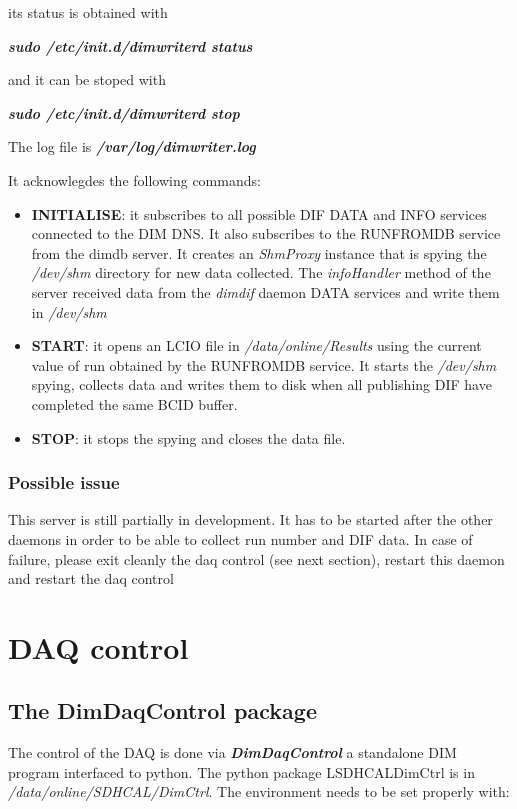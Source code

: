 \documentclass[english]{article}
\begin{document}
its status is obtained with 

{\sl \bf sudo /etc/init.d/dimwriterd status }

and it can be stoped with

{\sl \bf sudo /etc/init.d/dimwriterd stop }
 
 The log file is {\sl \bf /var/log/dimwriter.log }
 
 It acknowlegdes the following commands:
 \begin{itemize}
\item {\bf INITIALISE}: it subscribes to all possible DIF DATA and INFO services connected to the DIM DNS. It also subscribes to the RUNFROMDB service from the dimdb server. It creates an {\sl ShmProxy} instance that is spying the {\sl /dev/shm} directory for new data collected. The {\sl infoHandler} method of the server received data from the {\sl dimdif} daemon DATA services and write them in {\sl /dev/shm}
\item {\bf START}: it opens an LCIO file in {\sl /data/online/Results} using the current value of run obtained by the RUNFROMDB service. It starts the {\sl /dev/shm} spying, collects data and writes them to disk when all publishing DIF have completed the same BCID buffer.
\item {\bf STOP}: it stops the spying and closes the data file.
\end{itemize}

\subsubsection{Possible issue}

This server is still partially in development. It has to be started after the other daemons in order to be able
to collect run number and DIF data. In case of failure, please exit cleanly the daq control (see next section), restart this daemon and restart the daq control   

\section {DAQ control}


\subsection{ The DimDaqControl package }
The control of the DAQ is done via { \bf \sl DimDaqControl } a standalone DIM program interfaced to python. The python package LSDHCALDimCtrl  is in {\sl /data/online/SDHCAL/DimCtrl}. The environment needs to be set properly with:
\end{document}
